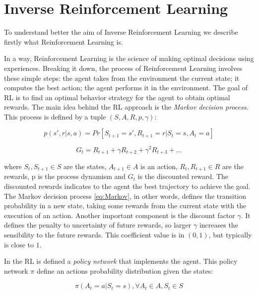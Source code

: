 \section{Inverse Reinforcement Learning}\label{IRL}

To understand better the aim of Inverse Reinforcement Learning we describe firstly what Reinforcement Learning is.

In a way, Reinforcement Learning is the science of making optimal decisions using experiences. Breaking it down, the process of Reinforcement Learning involves these simple steps: the agent takes from the environment the current state; it computes the best action; the agent performs it in the environment. The goal of RL is to find an optimal behavior strategy for the agent to obtain optimal rewards.
The main idea behind the RL approach is the \textsl{Markov decision process}. This process is defined by a tuple $( S, A, R, p, \gamma)$:

\begin{equation}\label{eq:Markov}
     p(s', r | s, a) = Pr[ S_{t+1} = s', R_{t+1} = r | S_{t} = s, A_{t} = a ] 
\end{equation}

\begin{equation}\label{eq:discounted}
    G_{t} = R_{t+1} + \gamma R_{t+2} + {\gamma}^2 R_{t+3} + \dots
\end{equation}
     


 where $S_{t}, S_{t+1} \in S$ are the states, $A_{t+1} \in A$ is an action, $R_{t}, R_{t+1} \in R$ are the rewards, p is the process dynamism and $G_{t}$ is the discounted reward. The discounted rewards indicates to the agent the best trajectory to achieve the goal. \\
 The Markov decision process \ref{eq:Markov}, in other words, defines the transition probability in a new state, taking some rewards from the current state with the execution of an action. 
Another important component is the discount factor $\gamma$. It defines the penalty to uncertainty of future rewards, so larger $\gamma$ increases the sensibility to the future rewards.
This coefficient value is in $(0,1)$, but typically is close to $1$.

In the RL is defined a \textsl{policy network} that implements the agent. This policy network $\pi$ define an actions probability distribution given the states:

\begin{equation}
    \pi( A_{t} = a | S_{t} = s), \forall A_{t} \in A, S_{t} \in S
\end{equation}

